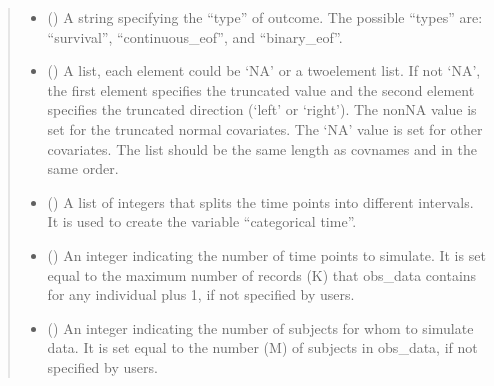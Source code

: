 \documentclass[letterpaper,10pt,english]{sphinxmanual}
\begin{document}
\begin{fulllineitems}
\begin{quote}
\begin{description}
\begin{itemize}
\item {} 
\sphinxAtStartPar
{} (\sphinxstyleliteralemphasis{\sphinxupquote{, }}) \textendash{} A string specifying the “type” of outcome. The possible “types” are: “survival”, “continuous\_eof”, and “binary\_eof”.

\item {} 
\sphinxAtStartPar
{} (\sphinxstyleliteralemphasis{\sphinxupquote{, }}) \textendash{} A list, each element could be ‘NA’ or a two\sphinxhyphen{}element list. If not ‘NA’, the first element specifies the truncated
value and the second element specifies the truncated direction (‘left’ or ‘right’). The non\sphinxhyphen{}NA value is set
for the truncated normal covariates. The ‘NA’ value is set for other covariates. The list should be the same
length as covnames and in the same order.

\item {} 
\sphinxAtStartPar
{} (\sphinxstyleliteralemphasis{\sphinxupquote{, }}) \textendash{} A list of integers that splits the time points into different intervals. It is used to create the variable
“categorical time”.

\item {} 
\sphinxAtStartPar
{} (\sphinxstyleliteralemphasis{\sphinxupquote{, }}) \textendash{} An integer indicating the number of time points to simulate. It is set equal to the maximum number of records (K)
that obs\_data contains for any individual plus 1, if not specified by users.

\item {} 
\sphinxAtStartPar
{} (\sphinxstyleliteralemphasis{\sphinxupquote{, }}) \textendash{} An integer indicating the number of subjects for whom to simulate data. It is set equal to the number (M) of
subjects in obs\_data, if not specified by users.


\end{itemize}
\end{description}
\end{quote}
\end{fulllineitems}
\end{document}
